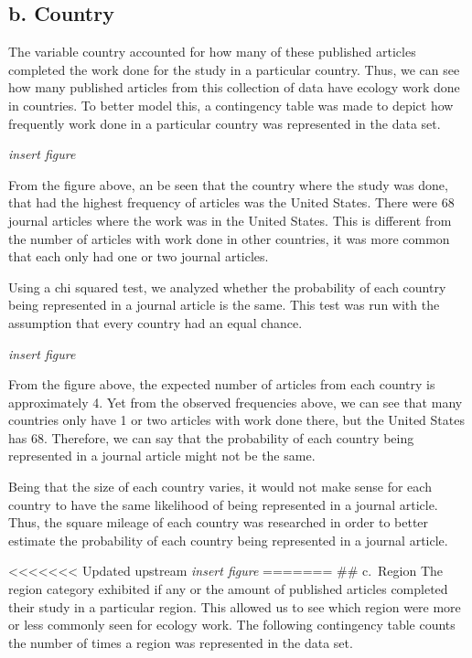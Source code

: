 \documentclass[
]{article}
\begin{document}
\hypertarget{b.-country}{%
\subsection{b. Country}\label{b.-country}}

The variable country accounted for how many of these published articles
completed the work done for the study in a particular country. Thus, we
can see how many published articles from this collection of data have
ecology work done in countries. To better model this, a contingency
table was made to depict how frequently work done in a particular
country was represented in the data set.

\emph{insert figure}

From the figure above, an be seen that the country where the study was
done, that had the highest frequency of articles was the United States.
There were 68 journal articles where the work was in the United States.
This is different from the number of articles with work done in other
countries, it was more common that each only had one or two journal
articles.

Using a chi squared test, we analyzed whether the probability of each
country being represented in a journal article is the same. This test
was run with the assumption that every country had an equal chance.

\emph{insert figure}

From the figure above, the expected number of articles from each country
is approximately 4. Yet from the observed frequencies above, we can see
that many countries only have 1 or two articles with work done there,
but the United States has 68. Therefore, we can say that the probability
of each country being represented in a journal article might not be the
same.

Being that the size of each country varies, it would not make sense for
each country to have the same likelihood of being represented in a
journal article. Thus, the square mileage of each country was researched
in order to better estimate the probability of each country being
represented in a journal article.

\textless\textless\textless\textless\textless\textless\textless{}
Updated upstream \emph{insert figure} ======= \#\# c.~Region The region
category exhibited if any or the amount of published articles completed
their study in a particular region. This allowed us to see which region
were more or less commonly seen for ecology work. The following
contingency table counts the number of times a region was represented in
the data set.
\end{document}
